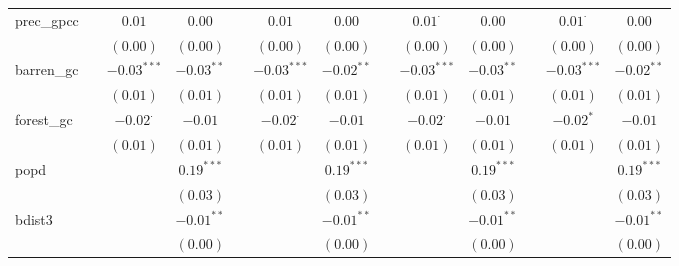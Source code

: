 \begin{sidewaystable}
\begin{center}
{\begin{tabular}{l c c c c c c c c c c c c}
prec\_gpcc          &               & $0.01$          & $0.00$          &               & $0.01$          & $0.00$          &               & $0.01^{\cdot}$  & $0.00$         &                 & $0.01^{\cdot}$  & $0.00$          \\
                    &               & $(0.00)$        & $(0.00)$        &               & $(0.00)$        & $(0.00)$        &               & $(0.00)$        & $(0.00)$       &                 & $(0.00)$        & $(0.00)$        \\
barren\_gc          &               & $-0.03^{***}$   & $-0.03^{**}$    &               & $-0.03^{***}$   & $-0.02^{**}$    &               & $-0.03^{***}$   & $-0.03^{**}$   &                 & $-0.03^{***}$   & $-0.02^{**}$    \\
                    &               & $(0.01)$        & $(0.01)$        &               & $(0.01)$        & $(0.01)$        &               & $(0.01)$        & $(0.01)$       &                 & $(0.01)$        & $(0.01)$        \\
forest\_gc          &               & $-0.02^{\cdot}$ & $-0.01$         &               & $-0.02^{\cdot}$ & $-0.01$         &               & $-0.02^{\cdot}$ & $-0.01$        &                 & $-0.02^{*}$     & $-0.01$         \\
                    &               & $(0.01)$        & $(0.01)$        &               & $(0.01)$        & $(0.01)$        &               & $(0.01)$        & $(0.01)$       &                 & $(0.01)$        & $(0.01)$        \\
popd                &               &                 & $0.19^{***}$    &               &                 & $0.19^{***}$    &               &                 & $0.19^{***}$   &                 &                 & $0.19^{***}$    \\
                    &               &                 & $(0.03)$        &               &                 & $(0.03)$        &               &                 & $(0.03)$       &                 &                 & $(0.03)$        \\
bdist3              &               &                 & $-0.01^{**}$    &               &                 & $-0.01^{**}$    &               &                 & $-0.01^{**}$   &                 &                 & $-0.01^{**}$    \\
                    &               &                 & $(0.00)$        &               &                 & $(0.00)$        &               &                 & $(0.00)$       &                 &                 & $(0.00)$        \\

\end{tabular}}
\end{center}
\end{sidewaystable}

